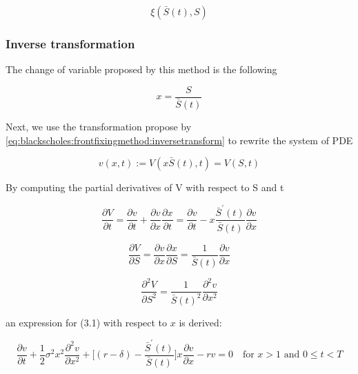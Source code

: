 \begin{equation}
  \xi(\bar{S}(t), S)
\end{equation}

\subsubsection{Inverse transformation}

The change of variable proposed by this method is the following

\begin{equation}
    x = \dfrac{S}{\bar{S}(t)}
    \label{eq:blackscholes:frontfixingmethod:inversetransform}
\end{equation}

Next, we use the transformation propose by \eqref{eq:blackscholes:frontfixingmethod:inversetransform}
to rewrite the system of PDE 

\begin{equation}
    v(x, t) := V(x\bar{S}(t), t) = V(S, t)
\end{equation}


By computing the partial derivatives of V with respect to S and t

\begin{equation}
    \dfrac{\partial{V}}{\partial{t}} =  \dfrac{\partial{v}}{\partial{t}} + \dfrac{\partial{v}}{\partial{x}} \dfrac{\partial{x}}{\partial{t}} 
    = \dfrac{\partial{v}}{\partial{t}} - x\dfrac{\bar{S}^\prime(t)}{\bar{S}(t)}\dfrac{\partial{v}}{\partial{x}} 
\end{equation}

\begin{equation}
    \dfrac{\partial{V}}{\partial{S}} = \dfrac{\partial{v}}{\partial{x}} 
    \dfrac{\partial{x}}{\partial{S}} = 
    \dfrac{1}{\bar{S}(t)} \dfrac{\partial{v}}{\partial{x}}
\end{equation}

\begin{equation}
    \dfrac{\partial^2{V}}{\partial{S^2}} =
    \dfrac{1}{\bar{S}(t)^2} \dfrac{\partial^2{v}}{\partial{x}^2}
\end{equation}

an expression for (3.1) with respect to $x$ is derived:

\begin{equation}
    \dfrac{\partial{v}}{\partial{t}} + \dfrac{1}{2}\sigma^{2} x^2 \dfrac{\partial^2{v}}{\partial{x}^2} + \bigg[(r - \delta) - \dfrac{\bar{S}^\prime(t)}{\bar{S}(t)}\bigg]x\dfrac{\partial{v}}{\partial{x}} - rv = 0 \quad \text{for $x > 1$ and $0 \le t < T$}
\end{equation}

